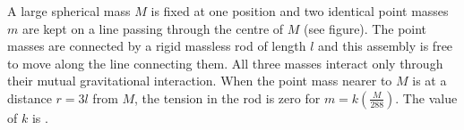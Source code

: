 
\item A large spherical mass \( M \) is fixed at one position and two identical point masses \( m \) are kept on a line passing through the centre of \( M \) (see figure). The point masses are connected by a rigid massless rod of length \( l \) and this assembly is free to move along the line connecting them. All three masses interact only through their mutual gravitational interaction. When the point mass nearer to \( M \) is at a distance \( r = 3l \) from \( M \), the tension in the rod is zero for \( m = k \left( \frac{M}{288} \right) \). The value of \( k \) is \underline{\hspace{2.5 cm}}.
    \begin{center}
    \end{center}
